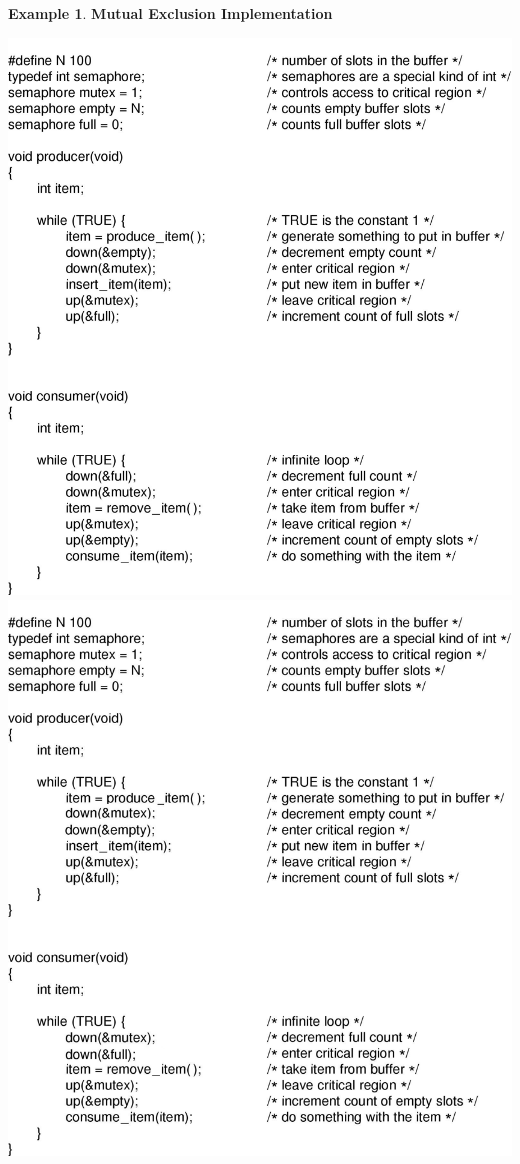 \documentclass[11pt,a4paper]{article}
\theoremstyle{definition}
\newtheorem{example}{Example}[section]
\newenvironment{myitemize}
{ \begin{itemize}
    \setlength{\itemsep}{5pt}
    \setlength{\parskip}{0pt}
    \setlength{\parsep}{0pt}     }
{ \end{itemize}                  }
\begin{document}
\begin{example}{\textbf{Mutual Exclusion Implementation}}
\begin{myitemize}
\begin{myitemize}
\begin{tcolorbox}
				\includegraphics[scale=0.45]{m1/producerConsumerCode1}
				\includegraphics[scale=0.45]{m1/producerConsumerCode2}

\end{tcolorbox}
\end{myitemize}
\end{myitemize}
\end{example}
\end{document}

